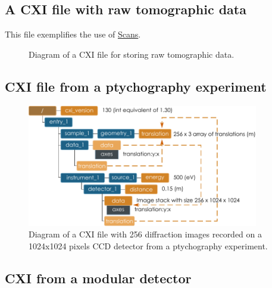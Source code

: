\documentclass[usletter,11pt]{article}
\begin{document}
\clearpage

\subsection{A CXI file with raw tomographic data}

This file exemplifies the use of \hyperref[sec:scans]{Scans}.

\begin{figure}[h!]
\centering
\caption{Diagram of a CXI file for storing raw tomographic data.}
\label{fig:tomography_raw_example}
\end{figure}

\clearpage

\subsection{CXI file from a ptychography experiment}

\begin{figure}[h!]
\centering
\includegraphics[width=0.9\textwidth]{ptychography_cxi.pdf}
\caption{Diagram of a CXI file with 256 diffraction images recorded on
  a 1024x1024 pixels CCD detector from a ptychography experiment.}
\label{fig:ptychography_cxi}
\end{figure}


\clearpage

\subsection{CXI from a modular detector}
\end{document}
